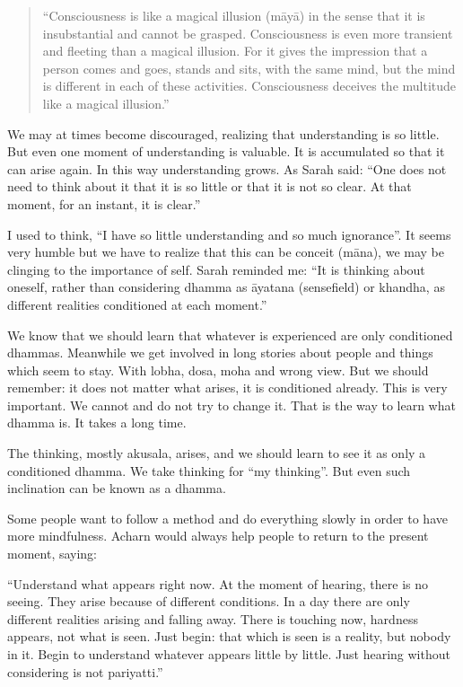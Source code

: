 \begin{quote}
``Consciousness is like a magical illusion (māyā) in the sense that it
is insubstantial and cannot be grasped. Consciousness is even more
transient and fleeting than a magical illusion. For it gives the
impression that a person comes and goes, stands and sits, with the same
mind, but the mind is different in each of these activities.
Consciousness deceives the multitude like a magical illusion.''
\end{quote}

We may at times become discouraged, realizing that understanding is so
little. But even one moment of understanding is valuable. It is
accumulated so that it can arise again. In this way understanding grows.
As Sarah said: ``One does not need to think about it that it is so
little or that it is not so clear. At that moment, for an instant, it is
clear.''

I used to think, ``I have so little understanding and so much
ignorance''. It seems very humble but we have to realize that this can
be conceit (māna), we may be clinging to the importance of self. Sarah
reminded me: ``It is thinking about oneself, rather than considering
dhamma as āyatana (sensefield) or khandha, as different realities
conditioned at each moment.''

We know that we should learn that whatever is experienced are only
conditioned dhammas. Meanwhile we get involved in long stories about
people and things which seem to stay. With lobha, dosa, moha and wrong
view. But we should remember: it does not matter what arises, it is
conditioned already. This is very important. We cannot and do not try to
change it. That is the way to learn what dhamma is. It takes a long
time.

The thinking, mostly akusala, arises, and we should learn to see it as
only a conditioned dhamma. We take thinking for ``my thinking''. But
even such inclination can be known as a dhamma.

Some people want to follow a method and do everything slowly in order to
have more mindfulness. Acharn would always help people to return to the
present moment, saying:

``Understand what appears right now. At the moment of hearing, there is
no seeing. They arise because of different conditions. In a day there
are only different realities arising and falling away. There is touching
now, hardness appears, not what is seen. Just begin: that which is seen
is a reality, but nobody in it. Begin to understand whatever appears
little by little. Just hearing without considering is not pariyatti.''


